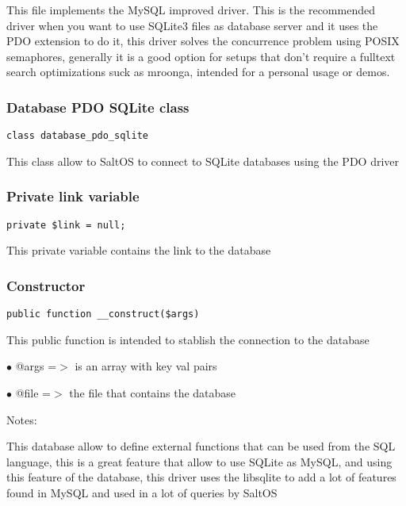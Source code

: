 \documentclass[a4paper]{article}
\begin{document}
This file implements the MySQL improved driver. This is the recommended driver when you want
to use SQLite3 files as database server and it uses the PDO extension to do it, this driver
solves the concurrence problem using POSIX semaphores, generally it is a good option for setups
that don't require a fulltext search optimizations suck as mroonga, intended for a personal
usage or demos.

\hypertarget{toc345}{}
\subsubsection{Database PDO SQLite class}

\begin{lstlisting}
class database_pdo_sqlite
\end{lstlisting}

This class allow to SaltOS to connect to SQLite databases using the PDO driver

\hypertarget{toc346}{}
\subsubsection{Private link variable}

\begin{lstlisting}
private $link = null;
\end{lstlisting}

This private variable contains the link to the database

\hypertarget{toc347}{}
\subsubsection{Constructor}

\begin{lstlisting}
public function __construct($args)
\end{lstlisting}

This public function is intended to stablish the connection to the database

\begin{compactitem}
\item[\color{myblue}$\bullet$] @args =$>$ is an array with key val pairs
\item[\color{myblue}$\bullet$] @file =$>$ the file that contains the database
\end{compactitem}

Notes:

This database allow to define external functions that can be used from the SQL language,
this is a great feature that allow to use SQLite as MySQL, and using this feature of the
database, this driver uses the libsqlite to add a lot of features found in MySQL and
used in a lot of queries by SaltOS
\end{document}
